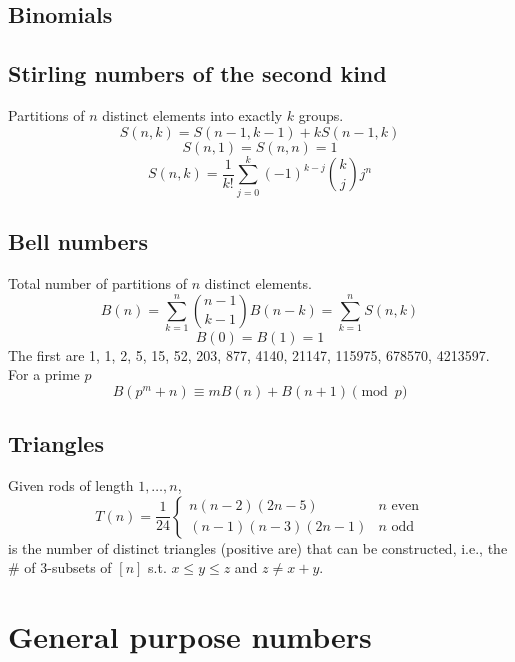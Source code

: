 	\subsection{Binomials}

	\subsection{Stirling numbers of the second kind}
		Partitions of $n$ distinct elements into exactly $k$ groups.
		$$S(n,k) = S(n-1,k-1) + k S(n-1,k)$$
		$$S(n,1) = S(n,n) = 1$$
		$$S(n,k) = \frac{1}{k!}\sum_{j=0}^k (-1)^{k-j}\binom{k}{j}j^n$$

	\subsection{Bell numbers}
		Total number of partitions of $n$ distinct elements.
		$$B(n) = \sum_{k=1}^n \binom{n-1}{k-1}B(n-k) = \sum_{k=1}^n S(n,k)$$
		$$B(0) = B(1) = 1$$
		The first are 1, 1, 2, 5, 15, 52, 203, 877, 4140, 21147, 115975, 678570, 4213597.
		For a prime $p$
		$$B(p^m+n)\equiv mB(n)+B(n+1) \pmod{p}$$

	\subsection{Triangles}
		Given rods of length $1,\ldots,n$,
		$$T(n) = \frac{1}{24} \left\{\begin{array}{ll}n(n-2)(2n-5) & n \text{ even}\\(n-1)(n-3)(2n-1) & n \text{ odd}\end{array}\right.$$
		is the number of distinct triangles (positive are) that can be constructed, i.e., the \# of 3-subsets of $[n]$ s.t. $x\leq y\leq z$ and $z\neq x+y$.

\section{General purpose numbers}
